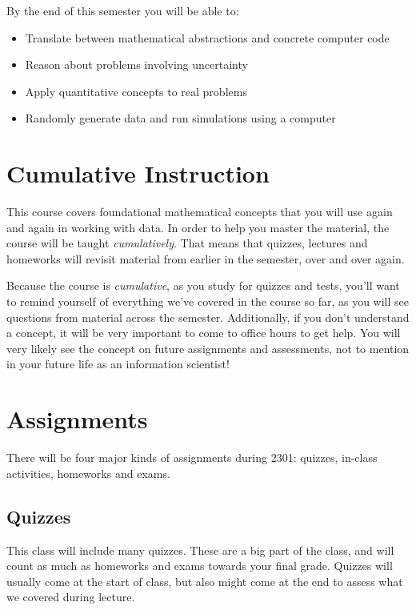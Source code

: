 \documentclass[10pt]{memoir}
\begin{document}
By the end of this semester you will be able to:
\begin{itemize}
\item Translate between mathematical abstractions and concrete computer code
\item Reason about problems involving uncertainty
\item Apply quantitative concepts to real problems
\item Randomly generate data and run simulations using a computer
\end{itemize}

\section{\textbf{Cumulative Instruction}}

This course covers foundational mathematical concepts that you will use again and again in working with data. In order to help you master the material, the course will be taught \textit{cumulatively}. That means that quizzes, lectures and homeworks will revisit material from earlier in the semester, over and over again. 

Because the course is \textit{cumulative}, as you study for quizzes and tests, you'll want to remind yourself of everything we've covered in the course so far, as you will see questions from material across the semester. Additionally, if you don't understand a concept, it will be very important to come to office hours to get help. You will very likely see the concept on future assignments and assessments, not to mention in your future life as an information scientist!

% 

\section{Assignments}

There will be four major kinds of assignments during 2301: quizzes, in-class activities, homeworks and exams.

\subsection{\textbf{Quizzes}}

This class will include many quizzes. These are a big part of the class, and will count as much as homeworks and exams towards your final grade. Quizzes will usually come at the start of class, but also might come at the end to assess what we covered during lecture. 
\end{document}
